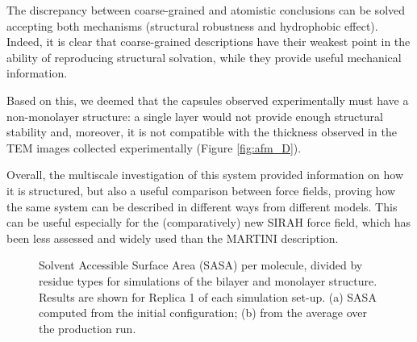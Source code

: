 The discrepancy between coarse-grained and atomistic conclusions can be solved accepting both mechanisms (structural robustness and hydrophobic effect). Indeed, it is clear that coarse-grained descriptions have their weakest point in the ability of reproducing structural solvation, while they provide useful mechanical information.
 
Based on this, we deemed that the capsules observed experimentally must have a non-monolayer structure: a single layer would not provide enough structural stability and, moreover, it is not compatible with the thickness observed in the TEM images collected experimentally (Figure \ref{fig:afm_D}).

Overall, the multiscale investigation of this system provided information on how it is structured, but also a useful comparison between force fields, proving how the same system can be described in different ways from different models. This can be useful especially for the (comparatively) new SIRAH force field, which has been less assessed and widely used than the MARTINI description.
%
\begin{figure}[t!]
\centering
{} 
\caption[SASA per residue of monolayer and bilater]{Solvent Accessible Surface Area (SASA) per molecule, divided by residue types for simulations of the bilayer and monolayer structure. Results are shown for Replica 1 of each simulation set-up. (a) SASA computed from the initial configuration; (b) from the average over the production run.}
\label{fig:mono_bi_sasa}
\end{figure}



